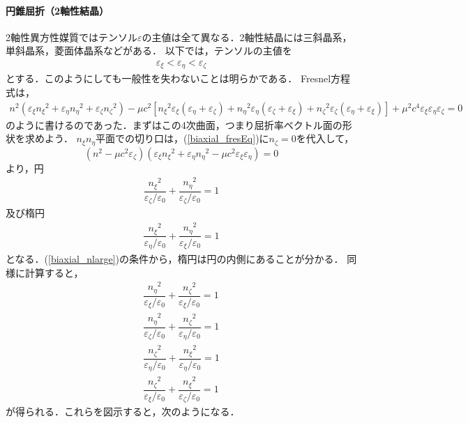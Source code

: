 \paragraph{円錐屈折（2軸性結晶）}
2軸性異方性媒質ではテンソル$\varepsilon$の主値は全て異なる．2軸性結晶には三斜晶系，単斜晶系，菱面体晶系などがある．
以下では，テンソルの主値を
\begin{align}
  \varepsilon_\xi < \varepsilon_\eta < \varepsilon_\zeta\label{biaxial_nlarge}
\end{align}
とする．このようにしても一般性を失わないことは明らかである．
Fresnel方程式は，
\begin{align}
  n^2\left(\varepsilon_{\xi}{n_\xi}^2+\varepsilon_{\eta}{n_\eta}^2+\varepsilon_{\zeta}{n_\zeta}^2\right)
  -\mu{c}^2\left[{n_\xi}^2\varepsilon_\xi(\varepsilon_\eta+\varepsilon_\zeta)
  +{n_\eta}^2\varepsilon_\eta(\varepsilon_\zeta+\varepsilon_\xi)
  +{n_\zeta}^2\varepsilon_\zeta(\varepsilon_\eta+\varepsilon_\xi)\right]
  +\mu^2{c}^4\varepsilon_\xi\varepsilon_\eta\varepsilon_\zeta=0\label{biaxial_fresEq}
\end{align}
のように書けるのであった．まずはこの4次曲面，つまり屈折率ベクトル面の形状を求めよう．
$n_\xi{}n_\eta$平面での切り口は，(\ref{biaxial_fresEq})に$n_\zeta=0$を代入して，
\[\left(n^2-\mu{c^2}\varepsilon_\zeta\right)\left(\varepsilon_\xi{n_\xi}^2+\varepsilon_\eta{n_\eta}^2-\mu{c^2}\varepsilon_\xi\varepsilon_\eta\right)=0\]
より，円
\begin{align}
  \dfrac{{n_\xi}^2}{\varepsilon_\zeta/\varepsilon_0}+\dfrac{{n_\eta}^2}{\varepsilon_\zeta/\varepsilon_0}=1
\end{align}
及び楕円
\begin{align}
  \dfrac{{n_\xi}^2}{\varepsilon_\eta/\varepsilon_0}+\dfrac{{n_\eta}^2}{\varepsilon_\xi/\varepsilon_0}=1
\end{align}
となる．(\ref{biaxial_nlarge})の条件から，楕円は円の内側にあることが分かる．
同様に計算すると，
\begin{align}
  \dfrac{{n_\eta}^2}{\varepsilon_\xi/\varepsilon_0}+\dfrac{{n_\zeta}^2}{\varepsilon_\xi/\varepsilon_0}=1\\
  \dfrac{{n_\eta}^2}{\varepsilon_\zeta/\varepsilon_0}+\dfrac{{n_\zeta}^2}{\varepsilon_\eta/\varepsilon_0}=1\\
  \dfrac{{n_\zeta}^2}{\varepsilon_\eta/\varepsilon_0}+\dfrac{{n_\xi}^2}{\varepsilon_\eta/\varepsilon_0}=1\label{biaxial_xzc}\\
  \dfrac{{n_\zeta}^2}{\varepsilon_\xi/\varepsilon_0}+\dfrac{{n_\xi}^2}{\varepsilon_\zeta/\varepsilon_0}=1\label{biaxial_xze}
\end{align}
が得られる．これらを図示すると，次のようになる．

